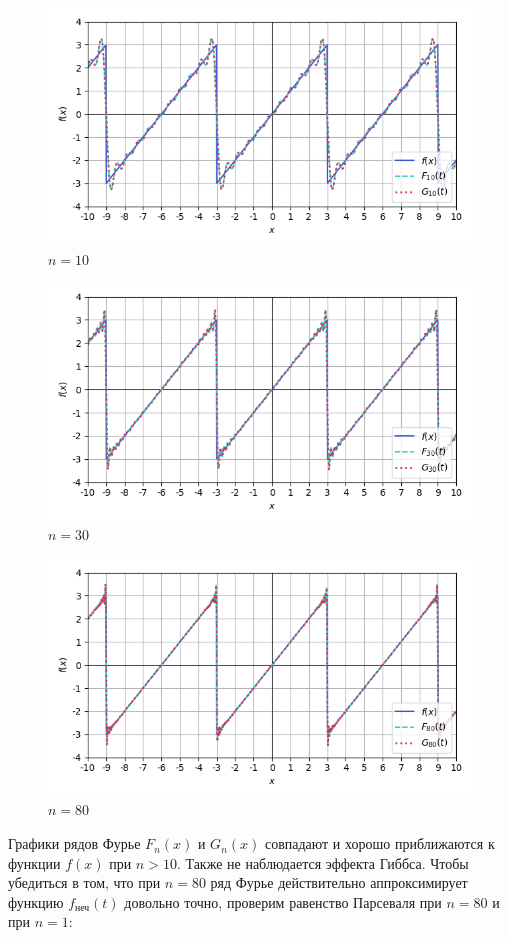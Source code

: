 \documentclass[a4paper]{article}
\begin{document}
\begin{figure}[H]
    \centering
    \includegraphics[width=0.7\linewidth]{odd/Im10.png}
    \caption{$n = 10$}
\end{figure}
\begin{figure}[H]
    \centering
    \includegraphics[width=0.7\linewidth]{odd/Im30.png}
    \caption{$n = 30$}
\end{figure}
\begin{figure}[H]
    \centering
    \includegraphics[width=0.7\linewidth]{odd/Im80.png}
    \caption{$n = 80$}
\end{figure}

Графики рядов Фурье $F_n(x)$ и $G_n(x)$ совпадают и хорошо приближаются к функции $f(x)$ при $n > 10$. Также не наблюдается эффекта Гиббса.
Чтобы убедиться в том, что при $n = 80$ ряд Фурье действительно аппроксимирует функцию $f_\text{неч}(t)$ довольно точно, проверим равенство Парсеваля при $n = 80$ и при $n = 1$:
\end{document}
